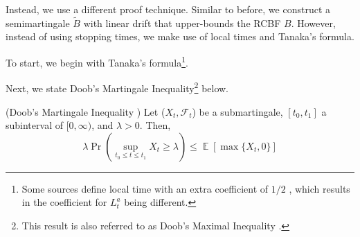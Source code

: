 \documentclass[twocolumn,amsthm]{autart}
\DeclareMathOperator{\E}{\mathbb{E}}
\begin{document}
Instead, we use a different proof technique. Similar to before, we construct a semimartingale $\tilde{B}$ with linear drift that upper-bounds the RCBF $B$. However, instead of using stopping times, we make use of local times and Tanaka's formula.

To start, we begin with Tanaka's formula\footnote{Some sources define local time with an extra coefficient of $1/2$ \cite{karatzas2012brownian}, which results in the coefficient for $L_t^a$ being different.}.
Next, we state Doob's Martingale Inequality\footnote{This result is also referred to as Doob's Maximal Inequality \cite{revuz2013continuous,le2016brownian}.} \cite{karatzas2012brownian} below.
\begin{lem}{(Doob's Martingale Inequality \cite[Thm 3.8]{karatzas2012brownian})}{}
    Let ($X_t, \mathcal{F}_t$) be a submartingale, $[t_0, t_1]$ a subinterval of $[0, \infty)$, and $\lambda > 0$. Then,
    \begin{equation} \label{eq:doob_ineq}
        \lambda \Pr\left( \sup_{t_0 \leq t \leq t_1} X_t \geq \lambda\right) \leq \E[\max\{X_t, 0\}]
    \end{equation}
\end{lem}
\end{document}
